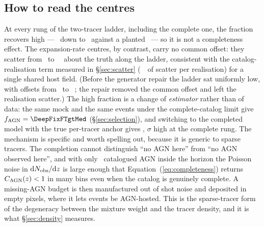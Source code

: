 \subsection{How to read the centres}
\label{sec:completeness:centres}

At every rung of the two-tracer ladder, including the complete one, the fraction
recovers high --- \IncCompleteF\ down to \IncMeighteenF\ against a planted
\IncFTruth\ --- so it is not a completeness effect. The expansion-rate
centres, by contrast, carry no common offset: they scatter from
\IncHzeroOffLo\ to \IncHzeroOffHi~\kmsmpc\ about the truth along the ladder,
consistent with the catalog-realisation term measured in \S\ref{sec:scatter}
(\SdsFixHzeroScatter~\kmsmpc\ of scatter per realisation) for a single shared
host field. (Before the generator repair the ladder sat uniformly low, with offsets from
\IncPreHzeroOffLo\ to \IncPreHzeroOffHi~\kmsmpc; the repair removed the
common offset and left the realisation scatter.) The high
fraction is a change of \emph{estimator} rather than of data: the same mock and
the same events under the complete-catalog limit give $\fagn = \DeepFixFTgtMed$
(\S\ref{sec:selection}), and switching to the completed model with the true
per-tracer anchor gives \IncCompleteFscan, \IncCompleteFscanSig$\sigma$ high
at the complete rung. The mechanism is specific and worth
spelling out, because it is generic to sparse tracers. The completion cannot
distinguish ``no AGN here'' from ``no AGN observed here'', and with only
\IncCompleteAgnInHorizon\ catalogued AGN inside the horizon the Poisson noise in
$\mathrm{d} N_{\rm obs}/\mathrm{d} z$ is large enough that Equation~(\ref{eq:completeness})
returns $C_{\rm AGN}(z) < 1$ in many bins even when the catalog is genuinely
complete. A missing-AGN budget is then manufactured out of shot noise and
deposited in empty pixels, where it lets events be AGN-hosted. This is the
sparse-tracer form of the degeneracy between the mixture weight and the tracer
density, and it is what \S\ref{sec:density} measures.
